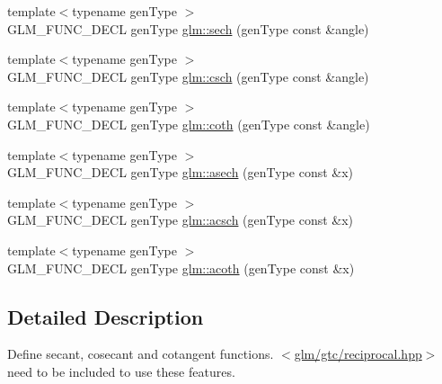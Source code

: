 \begin{DoxyCompactItemize}
\item 
{\footnotesize template$<$typename gen\-Type $>$ }\\G\-L\-M\-\_\-\-F\-U\-N\-C\-\_\-\-D\-E\-C\-L gen\-Type \hyperlink{group__gtc__reciprocal_gaaa698b992c63f454a3a1a1baa2773a3c}{glm\-::sech} (gen\-Type const \&angle)
\item 
{\footnotesize template$<$typename gen\-Type $>$ }\\G\-L\-M\-\_\-\-F\-U\-N\-C\-\_\-\-D\-E\-C\-L gen\-Type \hyperlink{group__gtc__reciprocal_ga00404a9cdf62023792d1d0afedd7f896}{glm\-::csch} (gen\-Type const \&angle)
\item 
{\footnotesize template$<$typename gen\-Type $>$ }\\G\-L\-M\-\_\-\-F\-U\-N\-C\-\_\-\-D\-E\-C\-L gen\-Type \hyperlink{group__gtc__reciprocal_gae2f1e6f7c360dda452b88e0c492d6f4d}{glm\-::coth} (gen\-Type const \&angle)
\item 
{\footnotesize template$<$typename gen\-Type $>$ }\\G\-L\-M\-\_\-\-F\-U\-N\-C\-\_\-\-D\-E\-C\-L gen\-Type \hyperlink{group__gtc__reciprocal_ga450f3bf1c04751198994d26d92ac2a63}{glm\-::asech} (gen\-Type const \&x)
\item 
{\footnotesize template$<$typename gen\-Type $>$ }\\G\-L\-M\-\_\-\-F\-U\-N\-C\-\_\-\-D\-E\-C\-L gen\-Type \hyperlink{group__gtc__reciprocal_ga418b31539e1a69c262712f2c7a4f27eb}{glm\-::acsch} (gen\-Type const \&x)
\item 
{\footnotesize template$<$typename gen\-Type $>$ }\\G\-L\-M\-\_\-\-F\-U\-N\-C\-\_\-\-D\-E\-C\-L gen\-Type \hyperlink{group__gtc__reciprocal_gad73911994e6bb6a06cc3ea1bd89201ab}{glm\-::acoth} (gen\-Type const \&x)
\end{DoxyCompactItemize}


\subsection{Detailed Description}
Define secant, cosecant and cotangent functions. $<$\hyperlink{reciprocal_8hpp}{glm/gtc/reciprocal.\-hpp}$>$ need to be included to use these features. 

